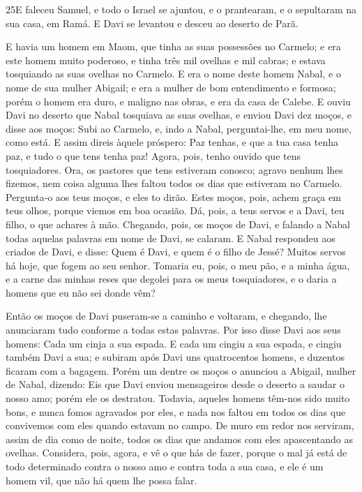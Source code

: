 \medskip

\lettrine{25} E faleceu Samuel, e todo o Israel se ajuntou, e
o prantearam, e o sepultaram na sua casa, em Ramá. E Davi se
levantou e desceu ao deserto de Parã.

E havia um homem em Maom, que tinha as suas possessões no Carmelo;
e era este homem muito poderoso, e tinha três mil ovelhas e mil
cabras; e estava tosquiando as suas ovelhas no Carmelo. E era o
nome deste homem Nabal, e o nome de sua mulher Abigail; e era a
mulher de bom entendimento e formosa; porém o homem era duro, e
maligno nas obras, e era da casa de Calebe. E ouviu Davi no
deserto que Nabal tosquiava as suas ovelhas, e enviou Davi dez
moços, e disse aos moços: Subi ao Carmelo, e, indo a Nabal,
perguntai-lhe, em meu nome, como está. E assim direis àquele
próspero: Paz tenhas, e que a tua casa tenha paz, e tudo o que tens
tenha paz! Agora, pois, tenho ouvido que tens tosquiadores. Ora,
os pastores que tens estiveram conosco; agravo nenhum lhes fizemos,
nem coisa alguma lhes faltou todos os dias que estiveram no Carmelo.
Pergunta-o aos teus moços, e eles to dirão. Estes moços, pois,
achem graça em teus olhos, porque viemos em boa ocasião. Dá, pois, a
teus servos e a Davi, teu filho, o que achares à mão. Chegando,
pois, os moços de Davi, e falando a Nabal todas aquelas palavras em
nome de Davi, se calaram. E Nabal respondeu aos criados de
Davi, e disse: Quem é Davi, e quem é o filho de Jessé? Muitos servos
há hoje, que fogem ao seu senhor. Tomaria eu, pois, o meu
pão, e a minha água, e a carne das minhas reses que degolei para os
meus tosquiadores, e o daria a homens que eu não sei donde vêm?

Então os moços de Davi puseram-se a caminho e voltaram, e
chegando, lhe anunciaram tudo conforme a todas estas palavras.
Por isso disse Davi aos seus homens: Cada um cinja a sua
espada. E cada um cingiu a sua espada, e cingiu também Davi a sua; e
subiram após Davi uns quatrocentos homens, e duzentos ficaram com a
bagagem. Porém um dentre os moços o anunciou a Abigail,
mulher de Nabal, dizendo: Eis que Davi enviou mensageiros desde o
deserto a saudar o nosso amo; porém ele os destratou.
Todavia, aqueles homens têm-nos sido muito bons, e nunca
fomos agravados por eles, e nada nos faltou em todos os dias que
convivemos com eles quando estavam no campo. De muro em redor
nos serviram, assim de dia como de noite, todos os dias que andamos
com eles apascentando as ovelhas. Considera, pois, agora, e
vê o que hás de fazer, porque o mal já está de todo determinado
contra o nosso amo e contra toda a sua casa, e ele é um homem vil,
que não há quem lhe possa falar.

